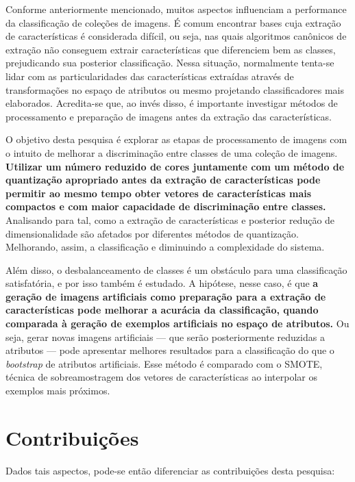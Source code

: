 Conforme anteriormente mencionado, muitos aspectos influenciam a performance da classificação de coleções de imagens. É comum encontrar bases cuja extração de características é considerada difícil, ou seja, nas quais algoritmos canônicos de extração não conseguem extrair características que diferenciem bem as classes, prejudicando sua posterior classificação. Nessa situação, normalmente tenta-se lidar com as particularidades das características extraídas através de transformações no espaço de atributos ou mesmo projetando classificadores mais elaborados. Acredita-se que, ao invés disso, é importante investigar métodos de processamento e preparação de imagens antes da extração das características.

O objetivo desta pesquisa é explorar as etapas de processamento de imagens com o intuito de melhorar a discriminação entre classes de uma coleção de imagens. \textbf{Utilizar um número reduzido de cores juntamente com um método de quantização apropriado antes da extração de características pode permitir ao mesmo tempo obter vetores de características mais compactos e com maior capacidade de discriminação entre classes.} Analisando para tal, como a extração de características e posterior redução de dimensionalidade são afetados por diferentes métodos de quantização. Melhorando, assim, a classificação e diminuindo a complexidade do sistema.

Além disso, o desbalanceamento de classes é um obstáculo para uma classificação satisfatória, e por isso também é estudado. A hipótese, nesse caso, é que \textbf{a geração de imagens artificiais como preparação para a extração de características pode melhorar a acurácia da classificação, quando comparada à geração de exemplos artificiais no espaço de atributos.} Ou seja, gerar novas imagens artificiais — que serão posteriormente reduzidas a atributos — pode apresentar melhores resultados para a classificação do que o \textit{bootstrap} de atributos artificiais. Esse método é comparado com o SMOTE, técnica de sobreamostragem dos vetores de características ao interpolar os exemplos mais próximos.

\section{Contribuições}

Dados tais aspectos, pode-se então diferenciar as contribuições desta pesquisa:

